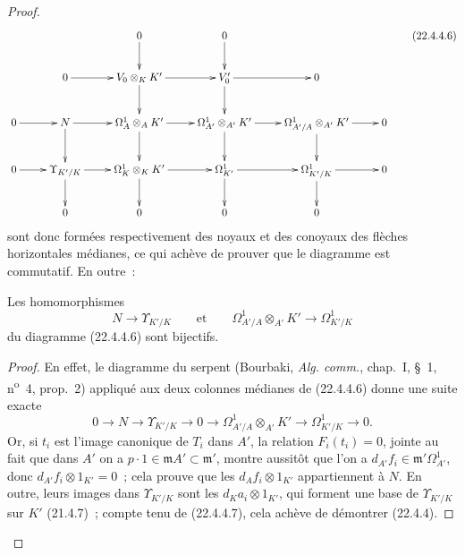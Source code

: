 \begin{proof}
\begin{equation}
\label{0.22.4.4.6-fr}
  \xymatrix{
    && 0 \ar[d] & 0 \ar[d] && \\
    & 0 \ar[r] & V_0\otimes_KK' \ar[r] \ar[d] & V_0' \ar[r] \ar[d] & 0 & \\
    0 \ar[r] & N \ar[r] \ar[d] & \Omega^1_A\otimes_AK' \ar[r] \ar[d] &
      \Omega^1_{A'}\otimes_{A'}K' \ar[r] \ar[d] &
      \Omega^1_{A'/A}\otimes_{A'}K' \ar[r] \ar[d] & 0 \\
    0 \ar[r] & \Upsilon_{K'/K} \ar[r] \ar[d] &
      \Omega^1_K\otimes_KK' \ar[r] \ar[d] & \Omega^1_{K'} \ar[r] \ar[d] &
      \Omega^1_{K'/K} \ar[r] \ar[d] & 0 \\
    & 0 & 0 & 0 & 0 &
  }
  \tag{22.4.4.6}
\end{equation}
sont donc formées respectivement des noyaux et des conoyaux des flèches
horizontales médianes, ce qui achève de prouver que le diagramme est
commutatif. En outre~:

\begin{lemma}[22.4.4.7]
\label{0.22.4.4.7-fr}
Les homomorphismes
\[
  N\longrightarrow\Upsilon_{K'/K}\qquad\text{et}\qquad
  \Omega^1_{A'/A}\otimes_{A'}K'\longrightarrow\Omega^1_{K'/K}
\]
du diagramme (22.4.4.6) sont bijectifs.
\end{lemma}

\begin{proof}
En effet, le diagramme du serpent (Bourbaki, \emph{Alg. comm.}, chap.~I,
§~1, n\textsuperscript{o}~4, prop.~2) appliqué aux deux colonnes médianes de
(22.4.4.6) donne une suite exacte
\[
  0\longrightarrow N\longrightarrow\Upsilon_{K'/K}\longrightarrow0
  \longrightarrow\Omega^1_{A'/A}\otimes_{A'}K'
  \longrightarrow\Omega^1_{K'/K}\longrightarrow0.
\]
Or, si $t_i$ est l'image canonique de $T_i$ dans $A'$, la relation
$F_i(t_i)=0$, jointe au fait que dans $A'$ on a
$p\cdot1\in\mathfrak mA'\subset\mathfrak m'$, montre aussitôt que l'on a
$d_{A'}f_i\in\mathfrak m'\Omega^1_{A'}$, donc
$d_{A'}f_i\otimes1_{K'}=0$~; cela prouve que les
$d_Af_i\otimes1_{K'}$ appartiennent à $N$. En outre, leurs images dans
$\Upsilon_{K'/K}$ sont les $d_Ka_i\otimes1_{K'}$, qui forment une base de
$\Upsilon_{K'/K}$ sur $K'$ (21.4.7)~; compte tenu de (22.4.4.7), cela achève
de démontrer (22.4.4).
\end{proof}
\end{proof}

